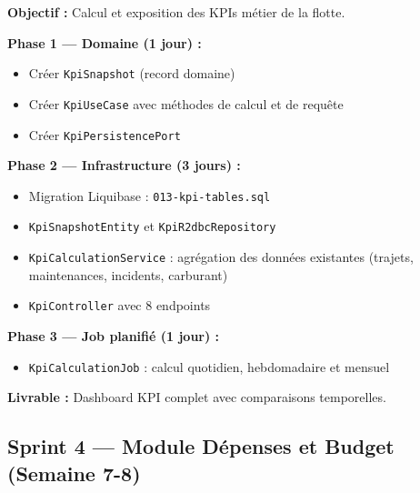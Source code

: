 \documentclass[12pt,a4paper]{report}
\begin{document}
\begin{tcolorbox}[colback=fleetsuccess!5, colframe=fleetsuccess, title={\bfseries Sprint 3 — Tableau de Bord KPI}]
\textbf{Objectif :} Calcul et exposition des KPIs métier de la flotte.

\textbf{Phase 1 — Domaine (1 jour) :}
\begin{itemize}[leftmargin=1.5cm]
  \item Créer \texttt{KpiSnapshot} (record domaine)
  \item Créer \texttt{KpiUseCase} avec méthodes de calcul et de requête
  \item Créer \texttt{KpiPersistencePort}
\end{itemize}

\textbf{Phase 2 — Infrastructure (3 jours) :}
\begin{itemize}[leftmargin=1.5cm]
  \item Migration Liquibase : \texttt{013-kpi-tables.sql}
  \item \texttt{KpiSnapshotEntity} et \texttt{KpiR2dbcRepository}
  \item \texttt{KpiCalculationService} : agrégation des données existantes (trajets, maintenances, incidents, carburant)
  \item \texttt{KpiController} avec 8 endpoints
\end{itemize}

\textbf{Phase 3 — Job planifié (1 jour) :}
\begin{itemize}[leftmargin=1.5cm]
  \item \texttt{KpiCalculationJob} : calcul quotidien, hebdomadaire et mensuel
\end{itemize}

\textbf{Livrable :} Dashboard KPI complet avec comparaisons temporelles.
\end{tcolorbox}

\subsection{Sprint 4 — Module Dépenses et Budget (Semaine 7-8)}
\end{document}
